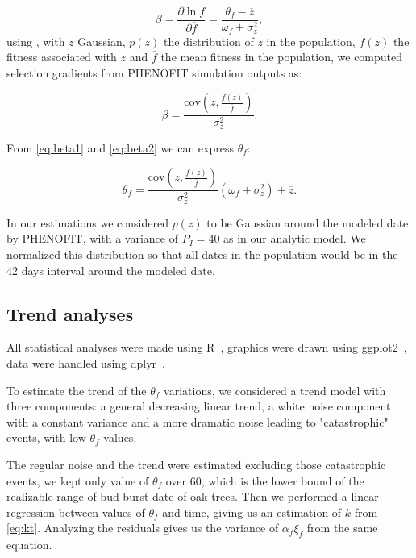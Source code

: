 \begin{equation}
	\label{eq:beta1}
	\beta = \frac{\partial \ln f}{\partial \overline{f}} = \frac{\theta_f - \overline{z}}{\omega_f + \sigma_z^2},
\end{equation}
using \citep{lande_measurement_1983}, with $z$ Gaussian, $p(z)$ the distribution of $z$ in the population, $f(z)$ the fitness associated with $z$ and $\overline{f}$ the mean fitness in the population, we computed selection gradients from PHENOFIT simulation outputs as:

\begin{equation}
	\label{eq:beta2}
	\beta = \frac{\text{cov}(z, \frac{f(z)}{\overline{f}})}{\sigma_z^2}.
\end{equation}

From \eqref{eq:beta1} and \eqref{eq:beta2} we can express $\theta_f$:

\begin{equation}
	\theta_f = \frac{\text{cov}(z, \frac{f(z)}{\overline{f}})}{\sigma_z^2} (\omega_f + \sigma_z^2) + \overline{z}.
\end{equation}

In our estimations we considered $p(z)$ to be Gaussian around the modeled date by \textsc{PHENOFIT}, with a variance of $P_I=40$ as in our analytic model. We normalized this distribution so that all dates in the population would be in the 42 days interval around the modeled date.

\subsection*{Trend analyses}

All statistical analyses were made using R~\citep{R_2014}, graphics were drawn using ggplot2~\citep{ggplot2_2009}, data were handled using dplyr~\citep{dplyr_2014}.

To estimate the trend of the $\theta_f$ variations, we considered a trend model with three components: a general decreasing linear trend, a white noise component with a constant variance and a more dramatic noise leading to "catastrophic" events, with low $\theta_f$ values.

The regular noise and the trend were estimated excluding those catastrophic events, we kept only value of $\theta_f$ over 60, which is the lower bound of the realizable range of bud burst date of oak trees. Then we performed a linear regression between values of $\theta_f$ and time, giving us an estimation of $k$ from \autoref{eq:kt}. Analyzing the residuals gives us the variance of $\alpha_f \xi_f$ from the same equation.

